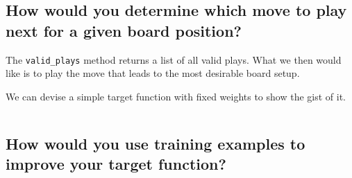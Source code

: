 \documentclass[11pt,a4paper]{article}
\begin{document}
    \subsection{How would you determine which move to play next for a given board position?} %
    \label{sub:how_would_you_determine_which_move_to_play_next_for_a_given_board_position_}
    
      The \texttt{valid\_plays} method returns a list of all valid plays.
      What we then would like is to play the move that leads to the most desirable board setup.
      
      We can devise a simple target function with fixed weights to show the gist of it.
      
      \inputminted[firstline=118,firstnumber=118,lastline=160,linenos=true]{python}{src/board.py}
    
    
    \subsection{How would you use training examples to improve your target function?} %
    \label{sub:how_would_you_use_training_examples_to_improve_your_target_function_}
    
      
    
  
\end{document}
